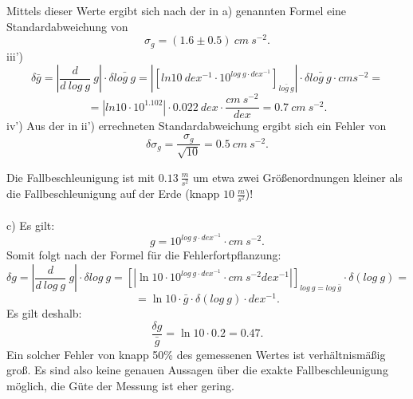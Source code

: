 \documentclass[titlepage]{scrartcl}
\begin{document}
Mittels dieser Werte ergibt sich nach der in a) genannten Formel eine Standardabweichung von 
\begin{equation}
\sigma_{g} = (1.6 \pm 0.5)\ cm\ s^{-2}.
\nonumber
\end{equation}
iii') 
\begin{equation}
\delta {\bar{g}} = \left|\frac{d}{d\ log\ g}\ g\right| \cdot \delta \bar{log\ g} = |[ln{10}\ dex^{-1} \cdot 10^{log\ g\cdot dex^{-1}}]_{\bar{log\ g}}| \cdot \delta \bar{log\ g}\cdot cm s ^{-2} =
\nonumber 
\end{equation}
\begin{equation}
= |ln{10} \cdot 10^{1.102}| \cdot 0.022 \ dex \cdot \frac{cm\ s^{-2}}{dex}  = 0.7\  cm\ s^{-2}.
\nonumber
\end{equation}
iv') Aus der in ii') errechneten Standardabweichung ergibt sich ein Fehler von 
\begin{equation}
\delta \sigma_{g} = \frac{\sigma_{g}}{\sqrt{10}} = 0.5 \ cm\ s^{-2}. 
\nonumber
\end{equation}

Die Fallbeschleunigung ist mit $ 0.13\ \frac{m}{s^2} $ um etwa zwei Größenordnungen kleiner als die Fallbeschleunigung auf der Erde (knapp $ 10\ \frac{m}{s^2} $)! \\ \\
c) Es gilt:  
\begin{equation}
g = 10^{log\ g\cdot dex^{-1}} \cdot cm\ s ^{-2}.
\nonumber
\end{equation} 
Somit folgt nach der Formel für die Fehlerfortpflanzung: 
\begin{equation}
\delta g = |\frac{d}{d\ log\ g}\ g| \cdot \delta log\ g = [|\ln 10 \cdot 10^{log\ g\cdot dex^{-1}} \cdot cm\ s ^{-2} dex^{-1}|]_{log\ g = log\ \bar{g}} \cdot \delta (log\ g)= 
\nonumber
\end{equation}
\begin{equation}
= \ln 10 \cdot \bar{g} \cdot \delta (log\ g) \cdot dex^{-1}. 
\nonumber
\end{equation}
Es gilt deshalb: 
\begin{equation}
\frac{\delta g}{\bar{g}} = \ln 10 \cdot 0.2 = 0.47.  
\end{equation}
Ein solcher Fehler von knapp 50\% des gemessenen Wertes ist verhältnismäßig groß. Es sind also keine genauen Aussagen über die exakte Fallbeschleunigung möglich, die Güte der Messung ist eher gering. 
\end{document}
